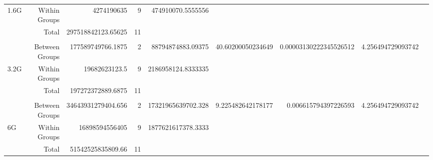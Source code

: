 \begin{landscape}
\begin{table}[!htp]
\begin{tabular}{lrrrrrrrr}
1.6G &Within Groups &4274190635 &9 &474910070.5555556 & & & \\
&Total &297518842123.65625 &11 & & & & \\
& & & & & & & \\
&Between Groups &177589749766.1875 &2 &88794874883.09375 &40.60200050234649 &0.00003130222345526512 &4.256494729093742 \\
3.2G &Within Groups &19682623123.5 &9 &2186958124.8333335 & & & \\
&Total &197272372889.6875 &11 & & & & \\
& & & & & & & \\
&Between Groups &34643931279404.656 &2 &17321965639702.328 &9.225482642178177 &0.006615794397226593 &4.256494729093742 \\
6G &Within Groups &16898594556405 &9 &1877621617378.3333 & & & \\
&Total &51542525835809.66 &11 & & & & \\
\bottomrule
\end{tabular}
\end{table}

\end{landscape}

